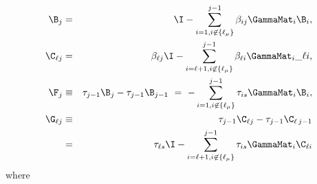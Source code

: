 \begin{eqnarray}
\B_j &=& \I - \sum\limits_{i=1,i\not \in \{\ell_\mu\}}^{j-1}\beta_{ij}\GammaMat_i \B_i, \\
\C_{\ell j} &=& \beta_{\ell j} \I - \sum\limits_{i=\ell+1, i\not\in\{\ell_\mu\}}^{j-1} \beta_{\ell i}\GammaMat_i\_{\ell i}, \label{eqn:cmatdef}\\
\F_j &\equiv& \tau_{j-1} \B_{j}-\tau_{j-1} \B_{j-1}
  \ =\ - \sum\limits_{i=1,i\not \in \{\ell_\mu\}}^{j-1} \tau_{is}\GammaMat_i\B_i, \\
\G_{\ell j}&\equiv& \tau_{j-1} \C_{\ell j}-\tau_{j-1} \C_{\ell \,j-1}
  \nonumber \\
 &=&\ \tau_{\ell s}\I- \sum\limits_{i=\ell+1,i \not \in \{\ell_\mu\}}^{j-1} \tau_{is}\GammaMat_i\C_{\ell i}
\end{eqnarray}
where 